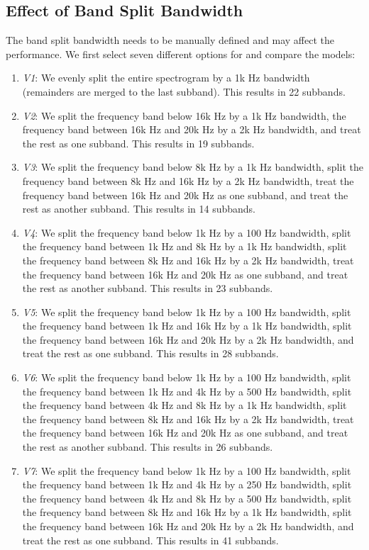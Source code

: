\subsection{Effect of Band Split Bandwidth}
\label{sec:bandwith}

The band split bandwidth  needs to be manually defined and may affect the performance. We first select seven different options for  and compare the models:
\begin{enumerate}
    \item \textit{V1}: We evenly split the entire spectrogram by a 1k Hz bandwidth (remainders are merged to the last subband). This results in 22 subbands.
    \item \textit{V2}: We split the frequency band below 16k Hz by a 1k Hz bandwidth, the frequency band between 16k Hz and 20k Hz by a 2k Hz bandwidth, and treat the rest as one subband. This results in 19 subbands.
    \item \textit{V3}: We split the frequency band below 8k Hz by a 1k Hz bandwidth, split the frequency band between 8k Hz and 16k Hz by a 2k Hz bandwidth, treat the frequency band between 16k Hz and 20k Hz as one subband, and treat the rest as another subband. This results in 14 subbands.
    \item \textit{V4}: We split the frequency band below 1k Hz by a 100 Hz bandwidth, split the frequency band between 1k Hz and 8k Hz by a 1k Hz bandwidth, split the frequency band between 8k Hz and 16k Hz by a 2k Hz bandwidth, treat the frequency band between 16k Hz and 20k Hz as one subband, and treat the rest as another subband. This results in 23 subbands.
    \item \textit{V5}: We split the frequency band below 1k Hz by a 100 Hz bandwidth, split the frequency band between 1k Hz and 16k Hz by a 1k Hz bandwidth, split the frequency band between 16k Hz and 20k Hz by a 2k Hz bandwidth, and treat the rest as one subband. This results in 28 subbands.
    \item \textit{V6}: We split the frequency band below 1k Hz by a 100 Hz bandwidth, split the frequency band between 1k Hz and 4k Hz by a 500 Hz bandwidth, split the frequency band between 4k Hz and 8k Hz by a 1k Hz bandwidth, split the frequency band between 8k Hz and 16k Hz by a 2k Hz bandwidth, treat the frequency band between 16k Hz and 20k Hz as one subband, and treat the rest as another subband. This results in 26 subbands.
    \item \textit{V7}: We split the frequency band below 1k Hz by a 100 Hz bandwidth, split the frequency band between 1k Hz and 4k Hz by a 250 Hz bandwidth, split the frequency band between 4k Hz and 8k Hz by a 500 Hz bandwidth, split the frequency band between 8k Hz and 16k Hz by a 1k Hz bandwidth, split the frequency band between 16k Hz and 20k Hz by a 2k Hz bandwidth, and treat the rest as one subband. This results in 41 subbands.
\end{enumerate}

